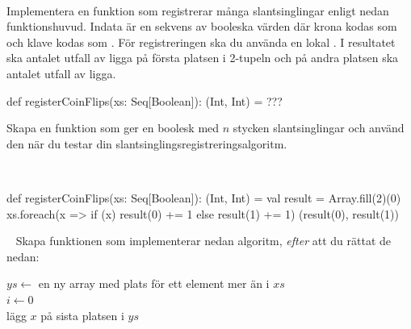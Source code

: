 \clearpage

\ExtraTasks %




\QUESTBEGIN

\Task \what~

\Subtask Implementera en funktion som registrerar många slantsinglingar enligt nedan funktionshuvud. Indata är en sekvens av booleska värden där krona kodas som  och klave kodas som . För registreringen ska du använda en lokal . I resultatet ska antalet utfall av  ligga på första platsen i 2-tupeln och på andra platsen ska antalet utfall av  ligga.

\begin{Code}
def registerCoinFlips(xs: Seq[Boolean]): (Int, Int) = ???
\end{Code}

\Subtask Skapa en funktion  som ger en boolesk  med $n$ stycken slantsinglingar och använd den när du testar din slantsinglingsregistreringsalgoritm.

\SOLUTION

\TaskSolved \what~

\SubtaskSolved
\begin{Code}
def registerCoinFlips(xs: Seq[Boolean]): (Int, Int) = {
  val result = Array.fill(2)(0)
  xs.foreach(x => if (x) result(0) += 1 else result(1) += 1)
  (result(0), result(1))
}
\end{Code}

\SubtaskSolved

\QUESTEND



\QUESTBEGIN

\Task \what~
Skapa funktionen  som implementerar nedan algoritm, \emph{efter} att du rättat de \textbf{\color{red}{två buggarna}} nedan:

\begin{algorithm}[H]

 $ys \leftarrow$ en ny array med plats för ett element mer än i $xs$\\
 $i \leftarrow 0$  \\
lägg $x$ på sista platsen i $ys$
\end{algorithm}

